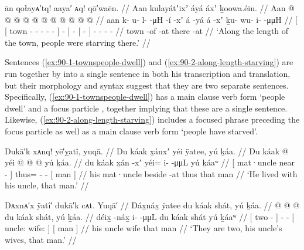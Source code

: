 \ex\label{ex:90-2-along-length-starving}%
%
\begingl
	\glpreamble	ān qołayᴀ′tq! aaya′ ᴀq! qō′waēn. //
	\glpreamble	Aan kulayátʼixʼ áyá áxʼ ḵoowa.éin. //
	\gla	{} {} Aan  @ {} @ {} @ {} @ {} @ {} {} {} {}
		 @ {}
		{}  @ {} {} 
		 @ {} @ {} @ {} @ {} //
	\glb	{} {} aan k- u- l-  -μH -í {} -xʼ {} 
		á -yá
		{} á -xʼ {}
		ḵu- wu- i-  -μμH //
	\glc	{}[ {}[ town - - -  - - {}] - {}]
		 -
		{}[  - {}]
		- - -  - //
	\gld	{} {} town  {} {} {} {} -of {} -at {}
		 {}
		{} there -at {}
		 {} {} {} {} //
	\glft	‘Along the length of the town, people were starving there.’
		//
\endgl
\xe

Sentences (\ref{ex:90-1-townspeople-dwell}) and (\ref{ex:90-2-along-length-starving}) are run together by \citeauthor{swanton:1909} into a single sentence in both his transcription and translation, but their morphology and syntax suggest that they are two separate sentences.
Specifically, (\ref{ex:90-1-townspeople-dwell}) has a main clause verb form  ‘people dwell’ and a focus particle , together implying that these are a single sentence.
Likewise, (\ref{ex:90-2-along-length-starving}) includes a focused phrase preceding the focus particle  as well as a main clause verb form  ‘people have starved’.

\ex\label{ex:90-3-lived-beside-uncle}%
%
\begingl
	\glpreamble	Dukā′k xᴀnq! yē′ỵatî, yuqā. //
	\glpreamble	Du káak x̱ánxʼ yéi ÿatee, yú ḵáa. //
	\gla	{} Du káak  @ {} {}
		yéi @  @ {} @ {} 
		{} yú ḵáa. {} //
	\glb	{} du káak x̱án -xʼ {}
		yéi= i-  -μμL
		{} yú ḵáaʷ {} //
	\glc	{}[  mat·uncle near - {}]
		thus= -  -
		{}[  man {}] //
	\gld	{} his mat·uncle beside -at {}
		thus  {} {} 
		{} that man {} //
	\glft	‘He lived with his uncle, that man.’
		//
\endgl
\xe

\ex\label{ex:90-4-wives-are-two}%
%
\begingl
	\glpreamble	Dᴀxnᴀ′x ÿatî′ dukā′k cᴀt.
Yuqā′ //
	\glpreamble	Dáx̱náx̱ ÿatee du káak shát, yú ḵáa. //
	\gla	{}  @ {} {}
		 @ {} @ {}
		{} du káak shát, {}
		{} yú ḵáa. {} //
	\glb	{} déix̱ -náx̱ {}
		i-  -μμL
		{} du káak shát {}
		{} yú ḵáaʷ {} //
	\glc	{}[ two - {}]
		-  -
		{}[  uncle: wife: {}]
		{}[  man {}] //
	\gld	{}  {} {}
		 {} {}
		{} his uncle wife {}
		{} that man {} //
	\glft	‘They are two, his uncle’s wives, that man.’
		//
\endgl
\xe

